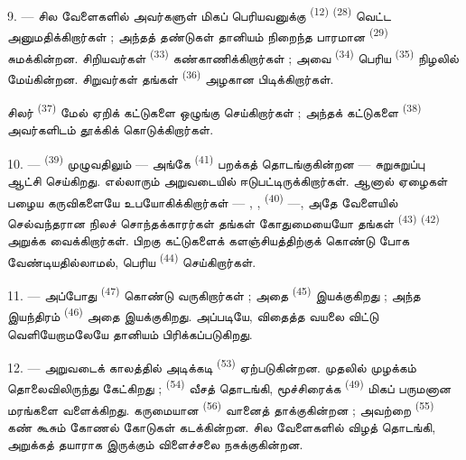 9. --- சில வேளைகளில் அவர்களுள் மிகப் பெரியவனுக்கு 
\textsuperscript{(12)}  \textsuperscript{(28)}
வெட்ட அனுமதிக்கிறார்கள் ; அந்தத் தண்டுகள் தானியம் நிறைந்த பாரமான
 \textsuperscript{(29)} சுமக்கின்றன. சிறியவர்கள்
 \textsuperscript{(33)} கண்காணிக்கிறார்கள் ; அவை
 \textsuperscript{(34)} பெரிய  \textsuperscript{(35)} நிழலில் மேய்கின்றன. சிறுவர்கள் தங்கள்
 \textsuperscript{(36)} அழகான  பிடிக்கிறார்கள்.

சிலர்  \textsuperscript{(37)} மேல் ஏறிக் கட்டுகளை
ஒழுங்கு செய்கிறார்கள் ; அந்தக் கட்டுகளை 
\textsuperscript{(38)} அவர்களிடம் தூக்கிக் கொடுக்கிறார்கள்.

10. ---  \textsuperscript{(39)} முழுவதிலும் — அங்கே
 \textsuperscript{(41)} பறக்கத் தொடங்குகின்றன —
சுறுசுறுப்பு ஆட்சி செய்கிறது. எல்லாரும் அறுவடையில் ஈடுபட்டிருக்கிறார்கள்.
ஆனால் ஏழைகள் பழைய கருவிகளையே உபயோகிக்கிறார்கள் — , ,  \textsuperscript{(40)} —, அதே வேளையில் செல்வந்தரான
நிலச் சொந்தக்காரர்கள் தங்கள் கோதுமையையோ தங்கள் 
\textsuperscript{(43)}  \textsuperscript{(42)}
அறுக்க வைக்கிறார்கள். பிறகு கட்டுகளைக் களஞ்சியத்திற்குக் கொண்டு போக
வேண்டியதில்லாமல், பெரிய 
\textsuperscript{(44)} செய்கிறார்கள்.

11. --- அப்போது  \textsuperscript{(47)}
கொண்டு வருகிறார்கள் ; அதை 
\textsuperscript{(45)} இயக்குகிறது ; அந்த இயந்திரம் 
\textsuperscript{(46)} அதை இயக்குகிறது. அப்படியே, விதைத்த வயலை விட்டு
வெளியேறாமலேயே தானியம்  பிரிக்கப்படுகிறது.

\VUsaut{5.0mm}
\VUsaut{3.4mm}

12. --- அறுவடைக் காலத்தில் அடிக்கடி 
\textsuperscript{(53)} ஏற்படுகின்றன. முதலில்  முழக்கம்
தொலைவிலிருந்து கேட்கிறது ; 
\textsuperscript{(54)} வீசத் தொடங்கி, மூச்சிரைக்க 
\textsuperscript{(49)} மிகப் பருமனான மரங்களை வளைக்கிறது. கருமையான
 \textsuperscript{(56)} வானைத் தாக்குகின்றன ; அவற்றை
 \textsuperscript{(55)} கண் கூசும் கோணல் கோடுகள்
கடக்கின்றன.  சில வேளைகளில் 
விழத் தொடங்கி, அறுக்கத் தயாராக இருக்கும் விளைச்சலை நசுக்குகின்றன.

